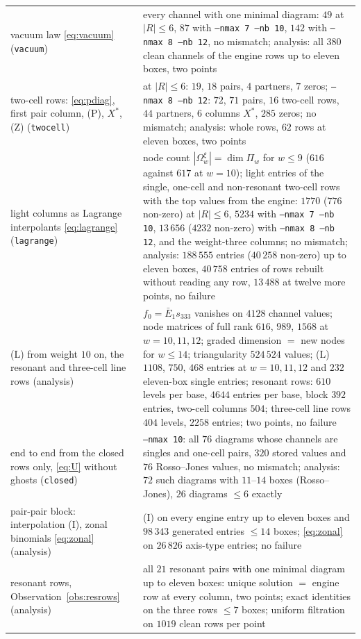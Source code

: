 \documentclass[11pt]{article}
\newcommand{\LMPH}[1]{\texttt{#1}}
\begin{document}
\begin{longtable}{p{}p{}}
vacuum law \eqref{eq:vacuum} (\LMPH{vacuum}) & every channel with one minimal diagram: $49$ at $|R|\le6$, $87$ with \LMPH{--nmax 7 --nb 10}, $142$ with \LMPH{--nmax 8 --nb 12}, no mismatch; analysis: all $380$ clean channels of the engine rows up to eleven boxes, two points\\
two-cell rows: \eqref{eq:pdiag}, first pair column, (P), $X^*$, (Z) (\LMPH{twocell}) & at $|R|\le6$: $19$, $18$ pairs, $4$ partners, $7$ zeros; \LMPH{--nmax 8 --nb 12}: $72$, $71$ pairs, $16$ two-cell rows, $44$ partners, $6$ columns $X^*$, $285$ zeros; no mismatch; analysis: whole rows, $62$ rows at eleven boxes, two points\\
light columns as Lagrange interpolants \eqref{eq:lagrange} (\LMPH{lagrange}) & node count $|\Omega^\xi_w|=\dim\Pi_w$ for $w\le9$ ($616$ against $617$ at $w=10$); light entries of the single, one-cell and non-resonant two-cell rows with the top values from the engine: $1770$ ($776$ non-zero) at $|R|\le6$, $5234$ with \LMPH{--nmax 7 --nb 10}, $13\,656$ ($4232$ non-zero) with \LMPH{--nmax 8 --nb 12}, and the weight-three columns; no mismatch; analysis: $188\,555$ entries ($40\,258$ non-zero) up to eleven boxes, $40\,758$ entries of rows rebuilt without reading any row, $13\,488$ at twelve more points, no failure\\
(L) from weight $10$ on, the resonant and three-cell line rows (analysis) & $f_0=\bar E_1s_{333}$ vanishes on $4128$ channel values; node matrices of full rank $616$, $989$, $1568$ at $w=10,11,12$; graded dimension $=$ new nodes for $w\le14$; triangularity $524\,524$ values; (L) $1108$, $750$, $468$ entries at $w=10,11,12$ and $232$ eleven-box single entries; resonant rows: $610$ levels per base, $4644$ entries per base, block $392$ entries, two-cell columns $504$; three-cell line rows $404$ levels, $2258$ entries; two points, no failure\\
end to end from the closed rows only, \eqref{eq:U} without ghosts (\LMPH{closed}) & \LMPH{--nmax 10}: all $76$ diagrams whose channels are singles and one-cell pairs, $320$ stored values and $76$ Rosso--Jones values, no mismatch; analysis: $72$ such diagrams with $11$--$14$ boxes (Rosso--Jones), $26$ diagrams $\le6$ exactly\\
pair-pair block: interpolation (I), zonal binomials \eqref{eq:zonal} (analysis) & (I) on every engine entry up to eleven boxes and $98\,343$ generated entries $\le14$ boxes; \eqref{eq:zonal} on $26\,826$ axis-type entries; no failure\\
resonant rows, Observation~\ref{obs:resrows} (analysis) & all $21$ resonant pairs with one minimal diagram up to eleven boxes: unique solution $=$ engine row at every column, two points; exact identities on the three rows $\le7$ boxes; uniform filtration on $1019$ clean rows per point\\

\end{longtable}
\end{document}
